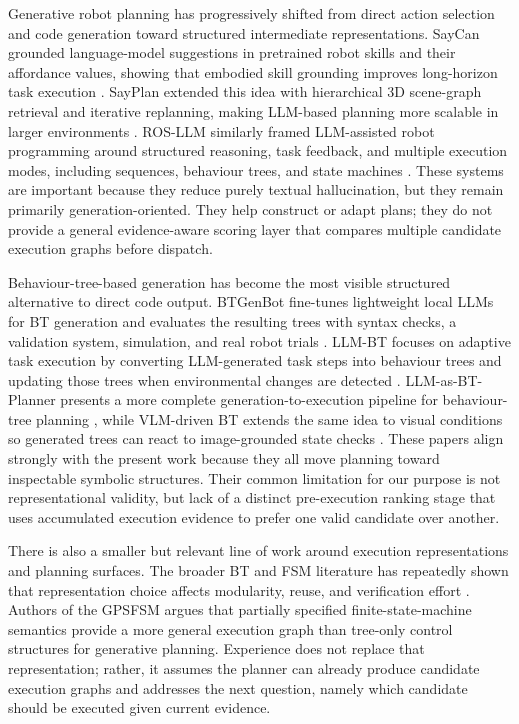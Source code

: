 \documentclass[letterpaper, 10pt, conference]{ieeeconf}
\begin{document}
Generative robot planning has progressively shifted from direct action selection and code generation toward structured intermediate representations. SayCan grounded language-model suggestions in pretrained robot skills and their affordance values, showing that embodied skill grounding improves long-horizon task execution \cite{ahn_as_2022}. SayPlan extended this idea with hierarchical 3D scene-graph retrieval and iterative replanning, making LLM-based planning more scalable in larger environments \cite{rana_sayplan_2023}. ROS-LLM similarly framed LLM-assisted robot programming around structured reasoning, task feedback, and multiple execution modes, including sequences, behaviour trees, and state machines \cite{mower_ros-llm_2024}. These systems are important because they reduce purely textual hallucination, but they remain primarily generation-oriented. They help construct or adapt plans; they do not provide a general evidence-aware scoring layer that compares multiple candidate execution graphs before dispatch.

Behaviour-tree-based generation has become the most visible structured alternative to direct code output. BTGenBot fine-tunes lightweight local LLMs for BT generation and evaluates the resulting trees with syntax checks, a validation system, simulation, and real robot trials \cite{izzo_btgenbot_2024}. LLM-BT focuses on adaptive task execution by converting LLM-generated task steps into behaviour trees and updating those trees when environmental changes are detected \cite{zhou_llm-bt_2024}. LLM-as-BT-Planner presents a more complete generation-to-execution pipeline for behaviour-tree planning \cite{ao_llm-as-bt-planner_2025}, while VLM-driven BT extends the same idea to visual conditions so generated trees can react to image-grounded state checks \cite{wake_vlm-driven_2025}. These papers align strongly with the present work because they all move planning toward inspectable symbolic structures. Their common limitation for our purpose is not representational validity, but lack of a distinct pre-execution ranking stage that uses accumulated execution evidence to prefer one valid candidate over another.

There is also a smaller but relevant line of work around execution representations and planning surfaces. The broader BT and FSM literature has repeatedly shown that representation choice affects modularity, reuse, and verification effort \cite{ghzouli_behavior_2023, iovino_programming_2022, iovino_comparison_2024}. Authors of the GPSFSM \cite{ratnayake2026generativepartiallyspecifiedfinite} argues that partially specified finite-state-machine semantics provide a more general execution graph than tree-only control structures for generative planning. Experience does not replace that representation; rather, it assumes the planner can already produce candidate execution graphs and addresses the next question, namely which candidate should be executed given current evidence.
\end{document}
